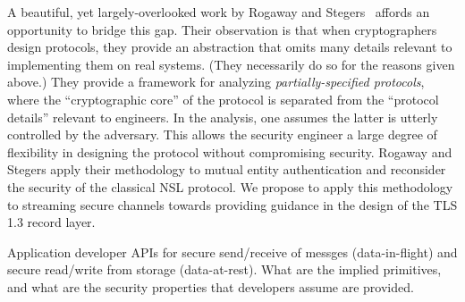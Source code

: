 \begin{task}
  A beautiful, yet largely-overlooked work by Rogaway and Stegers~\cite{RS09}
  affords an opportunity to bridge this gap. Their observation is that when
  cryptographers design protocols, they provide an abstraction that omits many
  details relevant to implementing them on real systems. (They necessarily do
  so for the reasons given above.)
  They provide a framework for analyzing \emph{partially-specified protocols},
  where the ``cryptographic core'' of the protocol is separated from the
  ``protocol details'' relevant to engineers. In the analysis, one assumes the
  latter is utterly controlled by the adversary. This  allows the security
  engineer a large degree of flexibility in designing the protocol without
  compromising security.
  Rogaway and Stegers apply their methodology to mutual entity authentication
  and reconsider the security of the classical NSL
  protocol.
  We propose to apply this methodology to streaming secure channels towards
  providing guidance in the design of the TLS 1.3 record layer.
\end{task}

\begin{task}
Application developer APIs for secure send/receive of messges
(data-in-flight) and secure read/write from storage (data-at-rest).  What are
the implied primitives, and what are the security properties that developers
assume are provided.
\end{task}

